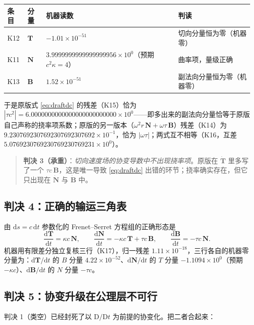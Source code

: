 \documentclass[UTF8,fontset=fandol,11pt]{ctexart}
\newcommand{\dd}{\mathrm{d}}
\newcommand{\DD}{\mathrm{D}}
\newcommand{\bx}{\boldsymbol}
\begin{document}
\begin{center}
\begin{tabular}{llll}
\toprule
条目 & 分量 & 机器读数 & 判读 \\
\midrule
K12 & $\bx T$ & $-1.01\times10^{-51}$ & 切向分量恒为零（机器零） \\
K11 & $\bx N$ & $3.9999999999999999956\times10^{0}$（预期 $c^2\kappa=4$） & 曲率项，量级正确 \\
K13 & $\bx B$ & $1.52\times10^{-51}$ & 副法向分量恒为零（机器零） \\
\bottomrule
\end{tabular}
\end{center}

于是原版式 \eqref{eq:draftdc} 的残差（K15）恰为 $|\tau c^2|=6.0000000000000000000000000\times10^{0}$——即多出来的副法向分量恰等于原版自己声称的挠率项系数；原版的另一版本（$\omega^2 r\,\bx N+\omega\tau\,\bx B$）残差（K14）为 $9.2307692307692307692307692\times10^{-1}$，恰为 $|\omega\tau|$；两式互不相等（K16，互差 $5.0769230769230769230769231\times10^{0}$）。

\begin{quote}
\textbf{判决 3（承重）}：\emph{切向速度场的协变导数中不出现挠率项}。原版在 $\dot{\bx T}$ 里多写了一个 $\tau c\,\bx B$，这是唯一导致 \eqref{eq:draftdc} 出错的环节；挠率确实存在，但它只出现在 $\dot{\bx N}$ 与 $\dot{\bx B}$ 中。
\end{quote}

\subsection{判决 4：正确的输运三角表}
由 $\dd s=c\,\dd t$ 参数化的 Frenet--Serret 方程组的正确形态是
\begin{equation}
  \frac{\dd\bx T}{\dd t}=\kappa c\,\bx N,\qquad
  \frac{\dd\bx N}{\dd t}=-\kappa c\,\bx T+\tau c\,\bx B,\qquad
  \frac{\dd\bx B}{\dd t}=-\tau c\,\bx N .
  \label{eq:fs}
\end{equation}
机器用有限差分独立复核三行（K17），归一残差 $1.11\times10^{-18}$，三行各自的机器零分量为：$\dd\bx T/\dd t$ 的 $B$ 分量 $4.22\times10^{-52}$、$\dd\bx N/\dd t$ 的 $T$ 分量 $-1.1094\times10^{0}$（预期 $-\kappa c$）、$\dd\bx B/\dd t$ 的 $N$ 分量 $-\tau c$。

\subsection{判决 5：协变升级在公理层不可行}
判决 1（类空）已经封死了以 $\DD/\DD t$ 为前提的协变化。把二者合起来：
\end{document}
